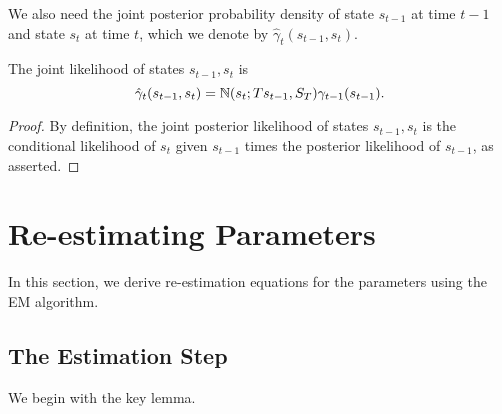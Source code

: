 \documentclass[12pt,leqno]{article}
\begin{document}
We also need the joint posterior probability density of state $s_{t-1}$ at time $t-1$ and state $s_t$ at time $t$,
which we denote by $\hat{\gamma}_t(s_{t-1},s_t)$.
\begin{Lem}\label{gamma_hat}
The joint likelihood of states $s_{t-1},s_t$ is
$$
    \hat{\gamma}_t(s_{t-1},s_t) = {\mathbb N}(s_t; Ts_{t-1},S_T)\gamma_{t-1}(s_{t-1}) .
$$
\end{Lem}
\begin{proof}
  By definition, the joint posterior likelihood of states $s_{t-1},s_t$ is the conditional likelihood of $s_t$ given
  $s_{t-1}$ times the posterior likelihood of $s_{t-1}$, as asserted.

\end{proof}

\newpage
\section{Re-estimating Parameters}
In this section, we derive re-estimation equations for the parameters using the EM algorithm.
\subsection{The Estimation Step}
We begin with the key lemma.
    
\end{document}
